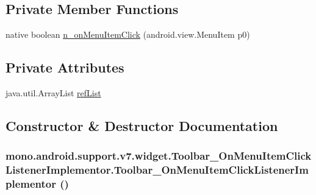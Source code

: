 \subsection*{Private Member Functions}
\begin{CompactItemize}
\item 
native boolean \hyperlink{classmono_1_1android_1_1support_1_1v7_1_1widget_1_1_toolbar___on_menu_item_click_listener_implementor_124d4be0ec8f25b133340955b303586b}{n\_\-onMenuItemClick} (android.view.MenuItem p0)
\end{CompactItemize}
\subsection*{Private Attributes}
\begin{CompactItemize}
\item 
java.util.ArrayList \hyperlink{classmono_1_1android_1_1support_1_1v7_1_1widget_1_1_toolbar___on_menu_item_click_listener_implementor_2f60f8fbcf6b47b4136cb41c8b5d31bf}{refList}
\end{CompactItemize}


\subsection{Constructor \& Destructor Documentation}
\hypertarget{classmono_1_1android_1_1support_1_1v7_1_1widget_1_1_toolbar___on_menu_item_click_listener_implementor_27b55f61988eb3e7263eb9525631e109}{
\subsubsection[{Toolbar\_\-OnMenuItemClickListenerImplementor}]{\setlength{\rightskip}{0pt plus 5cm}mono.android.support.v7.widget.Toolbar\_\-OnMenuItemClickListenerImplementor.Toolbar\_\-OnMenuItemClickListenerImplementor ()}}
\label{classmono_1_1android_1_1support_1_1v7_1_1widget_1_1_toolbar___on_menu_item_click_listener_implementor_27b55f61988eb3e7263eb9525631e109}




